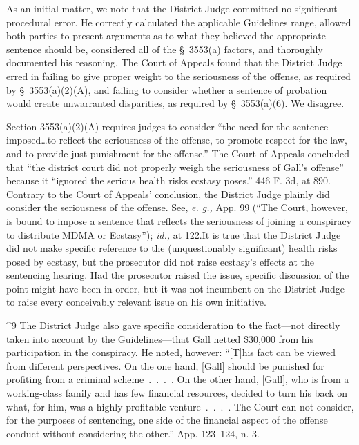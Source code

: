   As an initial matter, we note that the District Judge committed no
significant procedural error. He correctly calculated the applicable
Guidelines range, allowed both parties to present arguments as to
what they believed the appropriate sentence should be, considered all
of the \S~3553(a) factors, and thoroughly documented his reasoning.
The Court of Appeals found that the District Judge erred in failing
to give proper weight to the seriousness of the offense, as required
by \S~3553(a)(2)(A), and failing to consider whether a sentence
of probation would create unwarranted disparities, as required by
\S~3553(a)(6). We disagree.

  Section 3553(a)(2)(A) requires judges to consider ``the need for the
sentence imposed\dots to reflect the seriousness of the offense, to
promote respect for the law, and to provide just punishment for the
offense.'' The Court of Appeals concluded that ``the district court
did not properly weigh the seriousness of Gall's offense'' because
it ``ignored the serious health risks ecstasy poses.'' 446 F. 3d,
at 890. Contrary to the Court of Appeals' conclusion, the District
Judge plainly did consider the seriousness of the offense. See, \emph{e.
g.,} App. 99 (``The Court, however, is bound to impose a sentence that
reflects the seriousness of joining a conspiracy to distribute MDMA
or Ecstasy''); \emph{id.,} at 122.\footnotemark[9] It is true that the District
\newpage  Judge did not make specific reference to the (unquestionably
significant) health risks posed by ecstasy, but the prosecutor did not
raise ecstasy's effects at the sentencing hearing. Had the prosecutor
raised the issue, specific discussion of the point might have been in
order, but it was not incumbent on the District Judge to raise every
conceivably relevant issue on his own initiative.

^9 The District Judge also gave specific consideration to the fact---not
directly taken into account by the Guidelines---that Gall netted \$30,000
from his participation in the conspiracy. He noted, however: ``[T]his
fact can be viewed from different perspectives. On the one hand, [Gall]
should be punished for profiting from a criminal scheme~.~.~.~. On
the other hand, [Gall], who is from a working-class family and has few
financial resources, decided to turn his back on what, for him, was a
highly profitable venture~.~.~.~. The Court can not consider, for
the purposes of sentencing, one side of the financial aspect of the
offense conduct without considering the other.'' App. 123--124, n.
3.

